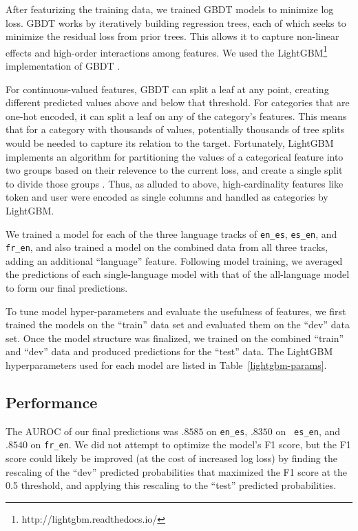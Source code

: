 \documentclass[11pt,a4paper]{article}
\begin{document}
After featurizing the training data, we trained GBDT models to minimize log loss. GBDT works by
iteratively building regression trees, each of which seeks to minimize the
residual loss from prior trees. This allows it to capture non-linear effects
and high-order interactions among features. We used the LightGBM\footnote{http://lightgbm.readthedocs.io/} implementation
of GBDT \cite{ke2017lightgbm}.

For continuous-valued features, GBDT can split a leaf at any point, creating
different predicted values above and below that threshold. For categories that
are one-hot encoded, it can split a leaf on any of the category's features. This
means that for a category with thousands of values, potentially thousands of
tree splits would be needed to capture its relation to the target. Fortunately,
LightGBM implements an algorithm for partitioning the values of a categorical
feature into two groups based on their relevence to the current loss, and create
a single split to divide those groups \cite{fisher1958grouping}. Thus, as
alluded to above, high-cardinality features like token and user were encoded as
single columns and handled as categories by LightGBM.

We trained a model for each of the three language tracks of {\tt en\_es}, {\tt es\_en},
and {\tt fr\_en}, and also trained a model on the combined data from
all three tracks, adding an additional ``language'' feature. Following model
training, we averaged the predictions of each single-language model with that of
the all-language model to form our final predictions.

To tune model hyper-parameters and evaluate the usefulness of features, we first
trained the models on the ``train'' data set and evaluated them on the ``dev''
data set. Once the model structure was finalized, we trained on the combined
``train'' and ``dev'' data and produced predictions for the ``test'' data. The
LightGBM hyperparameters used for each model are listed in Table~\ref{lightgbm-params}.



\subsection{Performance}

The AUROC of our final predictions was $.8585$ on {\tt en\_es}, $.8350$ on {\tt
  es\_en}, and $.8540$ on {\tt fr\_en}. We did not attempt to optimize the model's
F1 score, but the F1 score could likely be improved (at the cost of
increased log loss) by finding the
rescaling of the ``dev'' predicted probabilities that maximized the F1 score at
the 0.5 threshold, and applying this rescaling to the ``test'' predicted probabilities.
\end{document}
